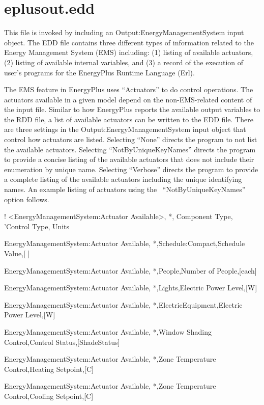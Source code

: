 \section{eplusout.edd}\label{eplusout.edd}

This file is invoked by including an Output:EnergyManagementSystem input object. The EDD file contains three different types of information related to the Energy Management System (EMS) including: (1) listing of available actuators, (2) listing of available internal variables, and (3) a record of the execution of user's programs for the EnergyPlus Runtime Language (Erl).

The EMS feature in EnergyPlus uses ``Actuators'' to do control operations. The actuators available in a given model depend on the non-EMS-related content of the input file. Similar to how EnergyPlus reports the available output variables to the RDD file, a list of available actuators can be written to the EDD file. There are three settings in the Output:EnergyManagementSystem input object that control how actuators are listed. Selecting ``None'' directs the program to not list the available actuators. Selecting ``NotByUniqueKeyNames'' directs the program to provide a concise listing of the available actuators that does not include their enumeration by unique name. Selecting ``Verbose'' directs the program to provide a complete listing of the available actuators including the unique identifying names. An example listing of actuators using the~ ``NotByUniqueKeyNames''~ option follows.

! \textless{}EnergyManagementSystem:Actuator Available\textgreater{}, *, Component Type, 'Control Type, Units

EnergyManagementSystem:Actuator Available, *,Schedule:Compact,Schedule Value,{[} {]}

EnergyManagementSystem:Actuator Available, *,People,Number of People,{[}each{]}

EnergyManagementSystem:Actuator Available, *,Lights,Electric Power Level,{[}W{]}

EnergyManagementSystem:Actuator Available, *,ElectricEquipment,Electric Power Level,{[}W{]}

EnergyManagementSystem:Actuator Available, *,Window Shading Control,Control Status,{[}ShadeStatus{]}

EnergyManagementSystem:Actuator Available, *,Zone Temperature Control,Heating Setpoint,{[}C{]}

EnergyManagementSystem:Actuator Available, *,Zone Temperature Control,Cooling Setpoint,{[}C{]}

